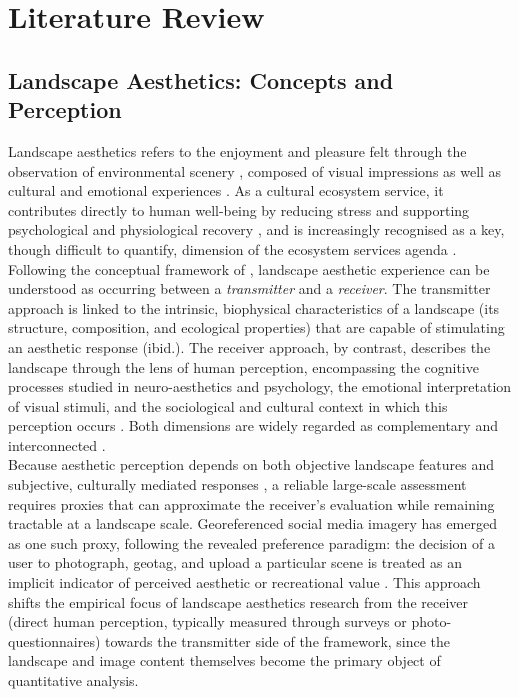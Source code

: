\documentclass[hidelinks, 11pt]{article}
\begin{document}
\section{Literature Review}\label{sec:Einleitung}

\subsection{Landscape Aesthetics: Concepts and Perception}\label{sec:LAConcepts}

Landscape aesthetics refers to the enjoyment and pleasure felt through the observation of environmental scenery \citep{swaffield_landscape_2013}, composed of visual impressions as well as cultural and emotional experiences \citep{bourassa_toward_1988}. As a cultural ecosystem service, it contributes directly to human well-being by reducing stress and supporting psychological and physiological recovery \citep{gobster_shared_2007}, and is increasingly recognised as a key, though difficult to quantify, dimension of the ecosystem services agenda \citep{daniel_contributions_2012}.
\\
Following the conceptual framework of \citep{tribot_integrating_2018}, landscape aesthetic experience can be understood as occurring between a \textit{transmitter} and a \textit{receiver}. The transmitter approach is linked to the intrinsic, biophysical characteristics of a landscape (its structure, composition, and ecological properties) that are capable of stimulating an aesthetic response (ibid.). The receiver approach, by contrast, describes the landscape through the lens of human perception, encompassing the cognitive processes studied in neuro-aesthetics and psychology, the emotional interpretation of visual stimuli, and the sociological and cultural context in which this perception occurs \citep{tribot_integrating_2018}. Both dimensions are widely regarded as complementary and interconnected \citep{gobster_shared_2007,tribot_integrating_2018}.
\\
Because aesthetic perception depends on both objective landscape features and subjective, culturally mediated responses \citep{daniel_whither_2001,tveit_key_2006,zhang_assessment_2022}, a reliable large-scale assessment requires proxies that can approximate the receiver's evaluation while remaining tractable at a landscape scale. Georeferenced social media imagery has emerged as one such proxy, following the revealed preference paradigm: the decision of a user to photograph, geotag, and upload a particular scene is treated as an implicit indicator of perceived aesthetic or recreational value \citep{wood_using_2013,langemeyer_mapping_2018}. This approach shifts the empirical focus of landscape aesthetics research from the receiver (direct human perception, typically measured through surveys or photo-questionnaires) towards the transmitter side of the framework, since the landscape and image content themselves become the primary object of quantitative analysis.
\end{document}
